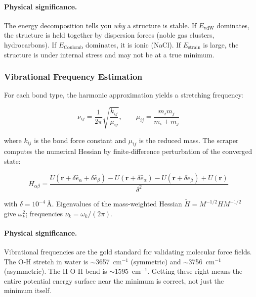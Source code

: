 \documentclass[11pt, a4paper, oneside]{article}
\theoremstyle{definition}
\theoremstyle{remark}
\begin{document}
\paragraph{Physical significance.}
The energy decomposition tells you \textit{why} a structure is stable.
If $E_{\text{vdW}}$ dominates, the structure is held together by
dispersion forces (noble gas clusters, hydrocarbons).  If
$E_{\text{Coulomb}}$ dominates, it is ionic (NaCl).  If
$E_{\text{strain}}$ is large, the structure is under internal stress
and may not be at a true minimum.

\subsubsection{Vibrational Frequency Estimation}

For each bond type, the harmonic approximation yields a stretching
frequency:

\begin{equation}
\nu_{ij} = \frac{1}{2\pi}\sqrt{\frac{k_{ij}}{\mu_{ij}}},
\qquad
\mu_{ij} = \frac{m_i m_j}{m_i + m_j}
\end{equation}

where $k_{ij}$ is the bond force constant and $\mu_{ij}$ is the reduced
mass.  The scraper computes the numerical Hessian by finite-difference
perturbation of the converged state:

\begin{equation}
H_{\alpha\beta} = \frac{U(\mathbf{r} + \delta\hat{e}_\alpha + \delta\hat{e}_\beta)
  - U(\mathbf{r} + \delta\hat{e}_\alpha)
  - U(\mathbf{r} + \delta\hat{e}_\beta)
  + U(\mathbf{r})}{\delta^2}
\end{equation}

with $\delta = 10^{-4}$\,\AA.  Eigenvalues of the mass-weighted
Hessian $\tilde{H} = M^{-1/2} H M^{-1/2}$ give $\omega_k^2$;
frequencies $\nu_k = \omega_k / (2\pi)$.

\paragraph{Physical significance.}
Vibrational frequencies are the gold standard for validating molecular
force fields.  The O-H stretch in water is $\sim$3657~cm$^{-1}$
(symmetric) and $\sim$3756~cm$^{-1}$ (asymmetric).  The H-O-H bend is
$\sim$1595~cm$^{-1}$.  Getting these right means the entire potential
energy surface near the minimum is correct, not just the minimum itself.

\end{document}

